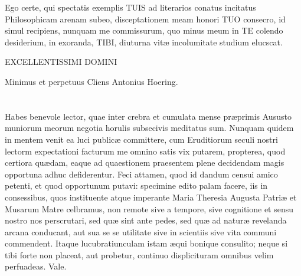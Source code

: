 \documentclass[a4paper, 11pt, oneside, polutonikogreek, latin]{article}
\begin{document}
Ego certe, qui spectatis exemplis TUIS ad literarios conatus incitatus Philosophicam arenam subeo, disceptationem meam honori TUO consecro, id simul recipiens, nunquam me commissurum, quo minus meum in TE colendo desiderium, in exoranda, TIBI, diuturna vitæ incolumitate studium elucscat.
\begin{center}
EXCELLENTISSIMI DOMINI
\end{center}
\begin{center}
Minimus et perpetuus Cliens Antonius Hoering.
\end{center}
\clearpage
\section[Ad Lectorem.]{}
\paragraph{}
Habes benevole lector, quae inter crebra et cumulata mense præprimis Aususto muniorum meorum negotia horulis subsecivis meditatus sum. Nunquam quidem in mentem venit ea luci publicæ committere, cum Eruditiorum seculi nostri lectorm expectationi facturum me omnino satis vix putarem, propterea, quod certiora quædam, eaque ad quaestionem praesentem plene decidendam magis opportuna adhuc defiderentur. Feci attamen, quod id dandum censui amico petenti, et quod opportunum putavi: specimine edito palam facere, iis in consessibus, quos instituente atque imperante Maria Theresia Augusta Patriæ et Musarum Matre celbramus, non remote sive a tempore, sive cognitione et sensu nostro nos perscrutari, sed quæ sint ante pedes, sed quæ ad naturæ revelanda arcana conducant, aut sua se se utilitate sive in scientiis sive vita communi commendent. Itaque lucubratiunculam istam æqui bonique consulito; neque si tibi forte non placeat, aut probetur, continuo displicituram omnibus velim perfuadeas. Vale.
\clearpage
\section[Historia pluviæ lapideæ ad Strkow.]{}
\end{document}
